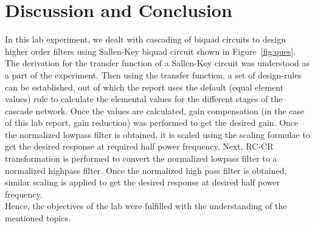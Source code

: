 \documentclass{lab_sheet}
\begin{document}
\section{Discussion and Conclusion}
In this lab experiment, we dealt with cascading of biquad circuits to design higher order filters using Sallen-Key biquad circuit shown in Figure~\ref{fig:ques}. The derivation for the transfer function of a Sallen-Key circuit was understood as a part of the experiment. Then using the transfer function, a set of design-rules can be established, out of which the report uses the default (equal element values) rule to calculate the elemental values for the different stages of the cascade network. Once the values are calculated, gain compensation (in the case of this lab report, gain reduction) was performed to get the desired gain. Once the normalized lowpass filter is obtained, it is scaled using the scaling formulae to get the desired response at required half power frequency. Next, RC-CR transformation is performed to convert the normalized lowpass filter to a normalized highpass filter. Once the normalized high pass filter is obtained, similar scaling is applied to get the desired response at desired half power frequency.\\
Hence, the objectives of the lab were fulfilled with the understanding of the mentioned topics.
    
\end{document}

